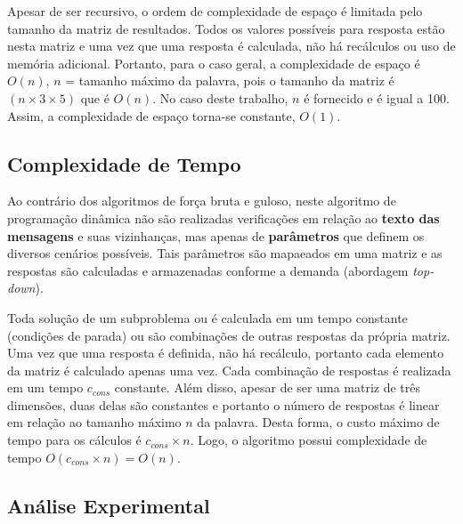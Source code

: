 \documentclass[a4paper,12pt,titlepage]{article}
\begin{document}
Apesar de ser recursivo, o ordem de complexidade de espaço é limitada pelo tamanho da matriz de resultados. Todos os valores possíveis para resposta estão nesta matriz e uma vez que uma resposta é calculada, não há recálculos ou uso de memória adicional. Portanto, para o caso geral, a complexidade de espaço é $O(n)$, $n$ = tamanho máximo da palavra, pois o tamanho da matriz é $(n \times 3 \times 5)$ que é $O(n)$. No caso deste trabalho, $n$ é fornecido e é igual a 100. Assim, a complexidade de espaço torna-se constante, $O(1)$.

\subsection{Complexidade de Tempo}

Ao contrário dos algoritmos de força bruta e guloso, neste algoritmo de programação dinâmica não são realizadas verificações em relação ao \textbf{texto das mensagens} e suas vizinhanças, mas apenas de \textbf{parâmetros} que definem os diversos cenários possíveis. Tais parâmetros são mapaeados em uma matriz e as respostas são calculadas e armazenadas conforme a demanda (abordagem \textit{top-down}).

Toda solução de um subproblema ou é calculada em um tempo constante (condições de parada) ou são combinações de outras respostas da própria matriz. Uma vez que uma resposta é definida, não há recálculo, portanto cada elemento da matriz é calculado apenas uma vez. Cada combinação de respostas é realizada em um tempo $c_{cons}$ constante. Além disso, apesar de ser uma matriz de três dimensões, duas delas são constantes e portanto o número de respostas é linear em relação ao tamanho máximo $n$ da palavra. Desta forma, o custo máximo de tempo para os cálculos é $c_{cons} \times n$. Logo, o algoritmo possui complexidade de tempo $O(c_{cons} \times n) = O(n)$.

\subsection{Análise Experimental}
\end{document}
